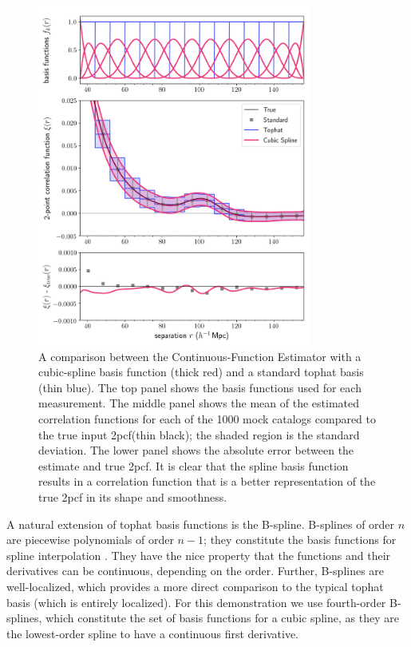 \documentclass[modern]{aastex62}
\newcommand{\cf}{2pcf\xspace} %
\newcommand{\est}{the Continuous-Function Estimator\xspace}
\begin{document}
\begin{figure}[ht]

\centering
    \includegraphics[width=0.8\textwidth]{xicomparison_2e-4_tophat8_spline}
    \caption{A comparison between \est with a cubic-spline basis function (thick red) and a standard tophat basis (thin blue). The top panel shows the basis functions used for each measurement. The middle panel shows the mean of the estimated correlation functions for each of the 1000 mock catalogs compared to the true input \cf (thin black); the shaded region is the standard deviation. The lower panel shows the absolute error between the estimate and true \cf. It is clear that the spline basis function results in a correlation function that is a better representation of the true \cf in its shape and smoothness.}
    \label{fig:spline}
\end{figure}

A natural extension of tophat basis functions is the B-spline.
B-splines of order $n$ are piecewise polynomials of order $n-1$; they constitute the basis functions for spline interpolation \citep{deBoor1987}.
They have the nice property that the functions and their derivatives can be continuous, depending on the order.
Further, B-splines are well-localized, which provides a more direct comparison to the typical tophat basis (which is entirely localized).
For this demonstration we use fourth-order B-splines, which constitute the set of basis functions for a cubic spline, as they are the lowest-order spline to have a continuous first derivative.
\end{document}
